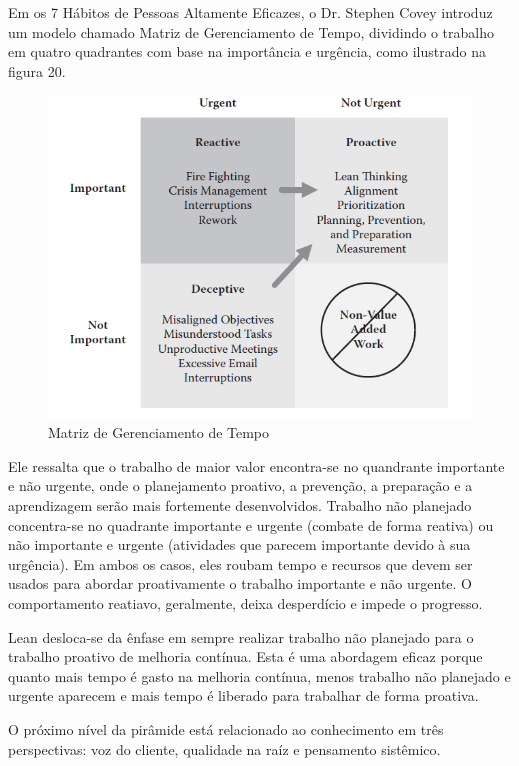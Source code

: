 \begin{anexosenv}
Em os 7 Hábitos de Pessoas Altamente Eficazes, o Dr. Stephen Covey introduz um modelo chamado Matriz de Gerenciamento de Tempo, dividindo o trabalho em quatro quadrantes com base na importância e urgência, como ilustrado na figura 20.

\begin{figure}[H]
		\centering
		\label{fig03}
			\includegraphics[scale=0.9]{figuras/matrizcomportamento.png}
		\caption{Matriz de Gerenciamento de Tempo \cite{bell2011}}
\end{figure}

Ele ressalta que o trabalho de maior valor encontra-se no quandrante importante e não urgente, onde o planejamento proativo, a prevenção, a preparação e a aprendizagem serão mais fortemente desenvolvidos. Trabalho não planejado concentra-se no quadrante importante e urgente (combate de forma reativa) ou não importante e urgente (atividades que parecem importante devido à sua urgência). Em ambos os casos, eles roubam tempo e recursos que devem ser usados para abordar proativamente o trabalho importante e não urgente. O comportamento reatiavo, geralmente, deixa desperdício e impede o progresso. 

Lean desloca-se da ênfase em sempre realizar trabalho não planejado para o trabalho proativo de melhoria contínua. Esta é uma abordagem eficaz porque quanto mais tempo é gasto na melhoria contínua, menos trabalho não planejado e urgente aparecem e mais tempo é liberado para trabalhar de forma proativa.

O próximo nível da pirâmide está relacionado ao conhecimento em três perspectivas: voz do cliente, qualidade na raíz e pensamento sistêmico.


\end{anexosenv}
